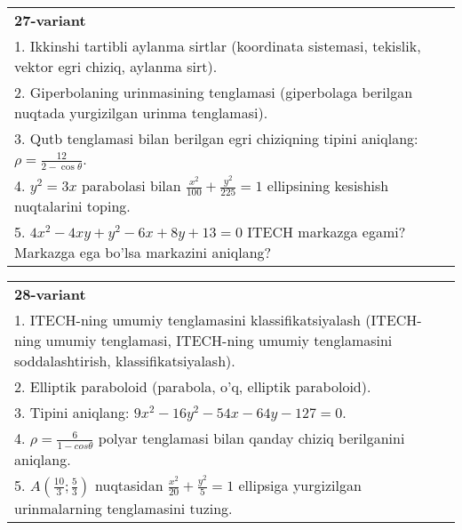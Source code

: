 \documentclass{article}
\begin{document}
\begin{tabular}{m{17cm}}
\textbf{27-variant}\\
1. Ikkinshi tartibli aylanma sirtlar (koordinata sistemasi, tekislik, vektor egri chiziq, aylanma sirt).\\

2. Giperbolaning urinmasining tenglamasi (giperbolaga berilgan nuqtada yurgizilgan urinma tenglamasi).\\

3. Qutb tenglamasi bilan berilgan egri chiziqning tipini aniqlang: $\rho=\frac{12}{2-\cos\theta}$.\\

4. $y^{2} = 3x$ parabolasi bilan $\frac{x^{2}}{100} + \frac{y^{2}}{225} = 1$ ellipsining kesishish nuqtalarini toping.  \\

5. $4x^{2} - 4xy + y^{2} - 6x + 8y + 13 = 0$ ITECH markazga egami? Markazga ega bo'lsa markazini aniqlang?  
\end{tabular}
\vspace{1cm}


\begin{tabular}{m{17cm}}
\textbf{28-variant}\\
1. ITECH-ning umumiy tenglamasini klassifikatsiyalash (ITECH-ning umumiy tenglamasi, ITECH-ning umumiy tenglamasini soddalashtirish, klassifikatsiyalash).\\

2. Elliptik paraboloid (parabola, o'q, elliptik paraboloid).\\

3. Tipini aniqlang: $9x^{2}-16y^{2}-54x-64y-127=0$.\\

4. $\rho = \frac{6}{1 - cos\theta}$ polyar tenglamasi bilan qanday chiziq berilganini aniqlang.  \\

5. $A(\frac{10}{3};\frac{5}{3})$ nuqtasidan $\frac{x^{2}}{20} + \frac{y^{2}}{5} = 1$ ellipsiga yurgizilgan urinmalarning tenglamasini tuzing.  
\end{tabular}
\vspace{1cm}
\end{document}
